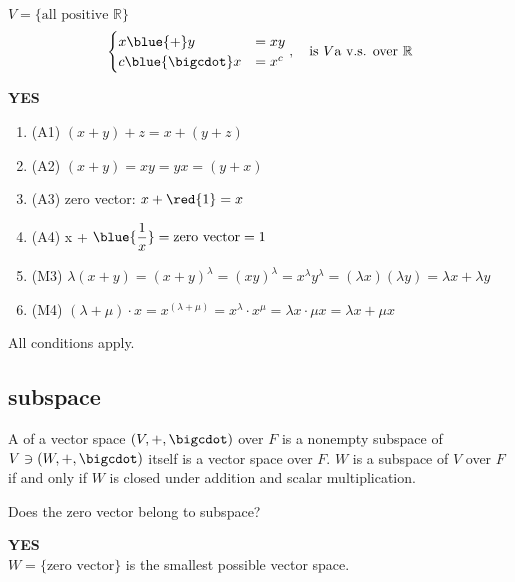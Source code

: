 \begin{exercise}
    $V = \{ \text{all positive } \mathbb{R} \}$ 
    \[
    \begin{cases}
        x \blue{+} y &= xy \\
        c \blue{\bigcdot} x &= x^c
    \end{cases}, \quad \text{is } V \text{a v.s. over } \mathbb{R}
    \]
\end{exercise}
\begin{answer}
    \textbf{YES}
    \begin{enumerate}[label=$\arabic*^\circ$]
        \item (A1) $(x+y)+z = x+(y+z)$
        \item (A2) $(x+y) = xy = yx = (y+x)$
        \item (A3) zero vector: $x + \red{1} = x$
        \item (A4) x + $\displaystyle \blue{\frac{1}{x}} = \text{zero vector} = 1$
        \item (M3) $\lambda(x+y) = (x+y)^\lambda = (xy)^\lambda = x^\lambda y^\lambda = (\lambda x)(\lambda y) = \lambda x + \lambda y$
        \item (M4) $(\lambda + \mu) \cdot x = x^{(\lambda + \mu)} = x^\lambda\cdot x^\mu = \lambda x \cdot \mu x = \lambda x + \mu x$
    \end{enumerate}
    All conditions apply.
\end{answer}

\newpage

\subsection{subspace}

\begin{definition}[subspace]
    A  of a vector space $(V, +, \bigcdot)$ over $F$ is a nonempty subspace of $V \ni (W, + , \bigcdot)$ itself is a vector space over $F$. $W$ is a subspace of $V$ over $F$ if and only if $W$ is closed under addition and scalar multiplication.
\end{definition}

\begin{exercise}
    Does the zero vector belong to subspace?
\end{exercise}
\begin{answer}
    \textbf{YES} \\
    $W = \{ \text{zero vector} \}$ is the smallest possible vector space.
\end{answer}

